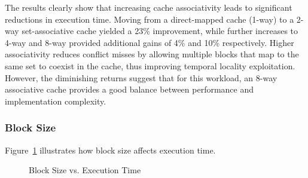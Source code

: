 \documentclass[a4paper,12pt]{article}
\begin{document}
The results clearly show that increasing cache associativity leads to significant reductions in execution time. Moving from a direct-mapped cache (1-way) to a 2-way set-associative cache yielded a 23\% improvement, while further increases to 4-way and 8-way provided additional gains of 4\% and 10\% respectively. Higher associativity reduces conflict misses by allowing multiple blocks that map to the same set to coexist in the cache, thus improving temporal locality exploitation. However, the diminishing returns suggest that for this workload, an 8-way associative cache provides a good balance between performance and implementation complexity.

\subsubsection{Block Size}

Figure~\ref{fig:blocksize-perf} illustrates how block size affects execution time.

\begin{figure}[htbp]
    \centering
    \caption{Block Size vs. Execution Time}
    \label{fig:blocksize-perf}
\end{figure}
\end{document}
